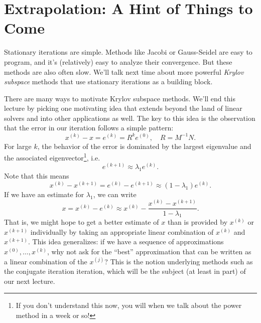 \documentclass[12pt, leqno]{article}
\begin{document}
\section*{Extrapolation: A Hint of Things to Come}

Stationary iterations are simple.  Methods like Jacobi or Gauss-Seidel
are easy to program, and it's (relatively) easy to analyze their
convergence.  But these methods are also often slow.  We'll talk next
time about more powerful {\em Krylov subspace} methods that use
stationary iterations as a building block.

There are many ways to motivate Krylov subspace methods.  We'll end
this lecture by picking one motivating idea that extends beyond
the land of linear solvers and into other applications as well.
The key to this idea is the observation that the error in our
iteration follows a simple pattern:
\[
  x^{(k)}-x = e^{(k)} = R^k e^{(0)}, \quad R = M^{-1} N.
\]
For large $k$, the behavior of the error is dominated by the largest
eigenvalue and the associated eigenvector\footnote{%
If you don't understand this now, you will when we talk about the
power method in a week or so!}, i.e.
\[
  e^{(k+1)} \approx \lambda_1 e^{(k)}.
\]
Note that this means
\[
  x^{(k)}-x^{(k+1)} = e^{(k)}-e^{(k+1)} \approx (1-\lambda_1) e^{(k)}.
\]
If we have an estimate for $\lambda_1$, we can write
\[
  x = x^{(k)} - e^{(k)} \approx
  x^{(k)}-\frac{x^{(k)}-x^{(k+1)}}{1-\lambda_1}.
\]
That is, we might hope to get a better estimate of $x$ than is
provided by $x^{(k)}$ or $x^{(k+1)}$ individually by taking an
appropriate linear combination of $x^{(k)}$ and $x^{(k+1)}$.  This
idea generalizes: if we have a sequence of approximations
$x^{(0)}, \ldots, x^{(k)}$, why not ask for the ``best'' approximation
that can be written as a linear combination of the $x^{(j)}$?
This is the notion underlying methods such as the conjugate iteration
iteration, which will be the subject (at least in part) of our next
lecture.
\end{document}
